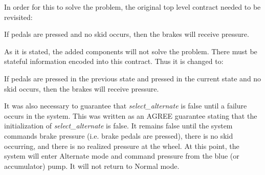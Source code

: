 In order for this to solve the problem, the original top level contract needed to be revisited: 

\begin{tt}
If pedals are pressed and no skid occurs, then the brakes will receive pressure. 
\end{tt}

As it is stated, the added components will not solve the problem. There must be stateful information encoded into this contract. Thus it is changed to: 

\begin{tt}
If pedals are pressed in the previous state and pressed in the current state and no skid occurs, then the brakes will receive pressure. 
\end{tt}

It was also necessary to guarantee that \textit{select\_alternate} is false until a failure occurs in the system. This was written as an AGREE guarantee stating that the initialization of \textit{select\_alternate} is false. It remains false until the system commands brake pressure (i.e. brake pedals are pressed), there is no skid occurring, and there is no realized pressure at the wheel. At this point, the system will enter Alternate mode and command pressure from the blue (or accumulator) pump. It will not return to Normal mode. 

















